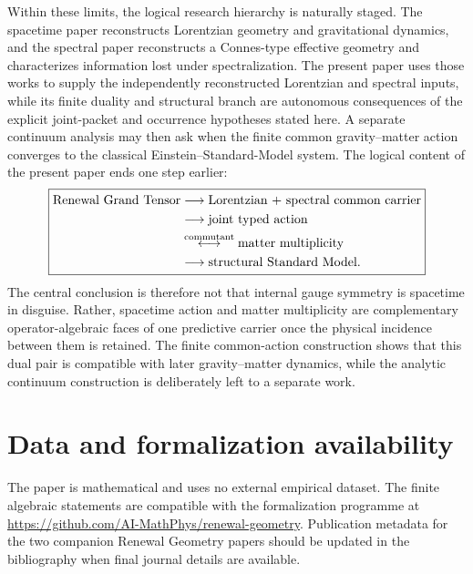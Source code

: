 \documentclass[11pt]{article}
\theoremstyle{definition}
\theoremstyle{remark}
\begin{document}
Within these limits, the logical research hierarchy is naturally staged.  The
spacetime paper reconstructs Lorentzian geometry and gravitational dynamics,
and the spectral paper reconstructs a Connes-type effective geometry and
characterizes information lost under spectralization.  The present paper uses
those works to supply the independently reconstructed Lorentzian and spectral
inputs, while its finite duality and structural branch are autonomous
consequences of the explicit joint-packet and occurrence hypotheses stated
here.  A separate continuum analysis may then
ask when the finite common gravity--matter action converges to the classical
Einstein--Standard-Model system.  The logical content of the present paper ends
one step earlier:
\begin{equation}
\boxed{
\begin{aligned}
\text{Renewal Grand Tensor}
&\longrightarrow
\text{Lorentzian + spectral common carrier}\\
&\longrightarrow
\text{joint typed action}\\
&\overset{\rm commutant}{\longleftrightarrow}
\text{matter multiplicity}\\
&\longrightarrow
\text{structural Standard Model}.
\end{aligned}}
\label{eq:discussion-chain}
\end{equation}
The central conclusion is therefore not that internal gauge symmetry is
spacetime in disguise.  Rather, spacetime action and matter multiplicity are
complementary operator-algebraic faces of one predictive carrier once the
physical incidence between them is retained.  The finite common-action construction shows that this dual
pair is compatible with later gravity--matter dynamics, while the analytic
continuum construction is deliberately left to a separate work.

\section*{Data and formalization availability}

The paper is mathematical and uses no external empirical dataset.  The finite
algebraic statements are compatible with the formalization programme at
\url{https://github.com/AI-MathPhys/renewal-geometry}.  Publication metadata
for the two companion Renewal Geometry papers should be updated in the
bibliography when final journal details are available.
\end{document}
